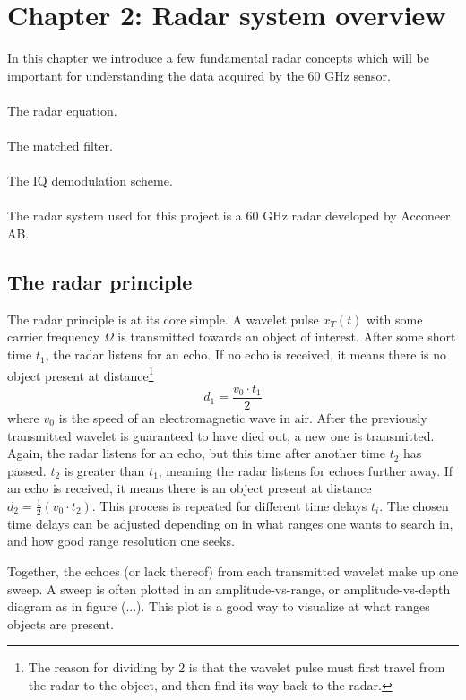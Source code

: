 \section{Chapter 2: Radar system overview}

In this chapter we introduce a few fundamental radar concepts which will be important for understanding the data acquired by the 60 GHz sensor.
\\ \\
The radar equation.
\\ \\
The matched filter.
\\ \\
The IQ demodulation scheme. 
\\ \\
The radar system used for this project is a 60 GHz radar developed by Acconeer AB.



\subsection{The radar principle}

The radar principle is at its core simple.  A wavelet pulse $x_T(t)$ with some carrier frequency $\Omega$  is transmitted towards an object of interest. After some short time $t_1$, the radar listens for an echo. If no echo is received, it means there is no object present at distance\footnote{The reason for dividing by 2 is that the wavelet pulse must first travel from the radar to the object, and then find its way back to the radar.}
\begin{equation}
	d_1 = \frac{v_0\cdot t_1}2
\end{equation}
where $v_0$ is the speed of an electromagnetic wave in air. After the previously transmitted wavelet is guaranteed to have died out, a new one is transmitted. Again, the radar listens for an echo, but this time after another time $t_2$ has passed. $t_2$ is greater than $t_1$, meaning the radar listens for echoes further away. If an echo is received, it means there is an object present at distance 
$
	d_2 = \frac12(v_0\cdot t_2).
$
This process is repeated for different time delays $t_i$. The chosen time delays can be adjusted depending on in what ranges one wants to search in, and how good range resolution one seeks.

Together, the echoes (or lack thereof) from each transmitted wavelet make up one sweep. A sweep is often plotted in an amplitude-vs-range, or amplitude-vs-depth diagram as in figure (...). This plot is a good way to visualize at what ranges objects are present.

